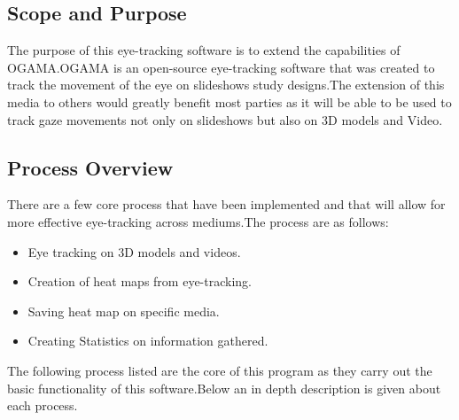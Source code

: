 \subsection{Scope and Purpose}
The purpose of this eye-tracking software is to extend the capabilities of OGAMA.OGAMA is an open-source eye-tracking software that was created to track the movement of the eye on slideshows study designs.The extension of this media to others would greatly benefit most parties as it will be able to be used to track gaze movements not only on slideshows but also on 3D models and Video.
\subsection{Process Overview }
There are a few core process that have been implemented and that will allow for more effective eye-tracking across mediums.The process are as follows:
\begin{itemize}
\item Eye tracking on 3D models and videos.
\item Creation of heat maps from eye-tracking.
\item Saving heat map on specific media.
\item Creating Statistics on information gathered.
\end{itemize}
The following process listed are the core of this program as they carry out the basic functionality of this software.Below an in depth description is given about each process.